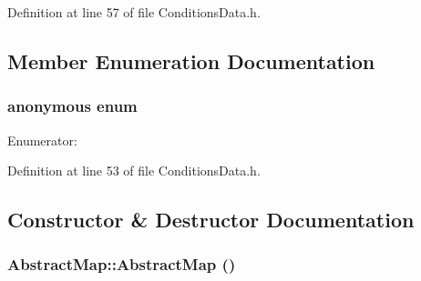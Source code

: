 Definition at line 57 of file ConditionsData.h.

\subsection{Member Enumeration Documentation}
\hypertarget{class_d_d4hep_1_1_conditions_1_1_abstract_map_a77a7651d9ea83e8c83ded9eb6765d532}{
\subsubsection[{"@0}]{\setlength{\rightskip}{0pt plus 5cm}anonymous enum}}
\label{class_d_d4hep_1_1_conditions_1_1_abstract_map_a77a7651d9ea83e8c83ded9eb6765d532}
\begin{Desc}
\item[Enumerator: ]\par
\begin{description}
\item[{\em 
\hypertarget{class_d_d4hep_1_1_conditions_1_1_abstract_map_a77a7651d9ea83e8c83ded9eb6765d532a00ddc93e8ea953666d5b3560926184e7}{
REGULAR}
\label{class_d_d4hep_1_1_conditions_1_1_abstract_map_a77a7651d9ea83e8c83ded9eb6765d532a00ddc93e8ea953666d5b3560926184e7}
}]\item[{\em 
\hypertarget{class_d_d4hep_1_1_conditions_1_1_abstract_map_a77a7651d9ea83e8c83ded9eb6765d532a79b94c3c134968d52e05163d53c5b7cc}{
ALIGNMENT}
\label{class_d_d4hep_1_1_conditions_1_1_abstract_map_a77a7651d9ea83e8c83ded9eb6765d532a79b94c3c134968d52e05163d53c5b7cc}
}]\end{description}
\end{Desc}



Definition at line 53 of file ConditionsData.h.

\subsection{Constructor \& Destructor Documentation}
\hypertarget{class_d_d4hep_1_1_conditions_1_1_abstract_map_a8642c9a5024d3390bd2cb8e3c889073a}{
\subsubsection[{AbstractMap}]{\setlength{\rightskip}{0pt plus 5cm}AbstractMap::AbstractMap ()}}
\label{class_d_d4hep_1_1_conditions_1_1_abstract_map_a8642c9a5024d3390bd2cb8e3c889073a}


